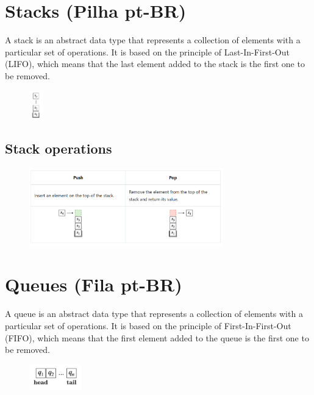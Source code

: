 \documentclass{article}
\begin{document}
\section{Stacks (Pilha pt-BR)} 

A stack is an abstract data type that represents a collection of elements with a particular set of operations. It is based on the principle of Last-In-First-Out (LIFO), which means that the last element added to the stack is the first one to be removed.

\begin{figure}[!ht]
    \centering
    \includegraphics*[width=0.055\textwidth]{images/stack.png}
\end{figure}

\subsection{Stack operations}

\begin{figure}[!ht]
    \centering
    \includegraphics*[width=0.75\textwidth]{images/stack_operations.png}
\end{figure}

\section{Queues (Fila pt-BR)}

A queue is an abstract data type that represents a collection of elements with a particular set of operations. It is based on the principle of First-In-First-Out (FIFO), which means that the first element added to the queue is the first one to be removed.

\begin{figure}[!ht]
    \centering
    \includegraphics*[width=0.2\textwidth]{images/queue.png}
\end{figure}
\end{document}
